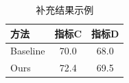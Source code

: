 \begin{table}[htbp]
    \centering
    \caption{补充结果示例}
    \label{tab:supplementary-results}
    \begin{tabular}{lcc}
        \toprule
        方法 & 指标C & 指标D \\
        \midrule
        Baseline & 70.0 & 68.0 \\
        Ours & 72.4 & 69.5 \\
        \bottomrule
    \end{tabular}
\end{table}
